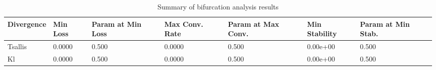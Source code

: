 \begin{table}
\centering
\caption{Summary of bifurcation analysis results}
\label{tab:bifurcation_summary}
\begin{tabular}{lllllll}
\toprule
Divergence & Min Loss & Param at Min Loss & Max Conv. Rate & Param at Max Conv. & Min Stability & Param at Min Stab. \\
\midrule
   Tsallis &   0.0000 &             0.500 &         0.0000 &              0.500 &      0.00e+00 &              0.500 \\
        Kl &   0.0000 &             0.500 &         0.0000 &              0.500 &      0.00e+00 &              0.500 \\
\bottomrule
\end{tabular}
\end{table}
